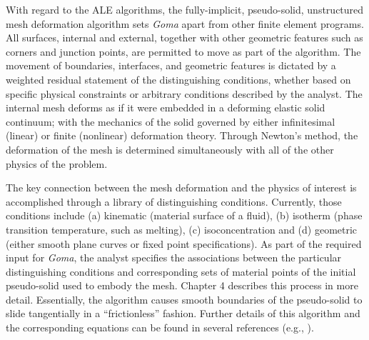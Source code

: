 With regard to the ALE algorithms, the fully-implicit, pseudo-solid, unstructured mesh deformation algorithm sets \emph{Goma} apart from other finite element programs. All surfaces, internal and external, together with other geometric features such as corners and junction points, are permitted to move as part of the algorithm. The movement of boundaries, interfaces, and geometric features is dictated by a weighted residual statement of the distinguishing conditions, whether based on specific physical constraints or arbitrary conditions described by the analyst. The internal mesh deforms as if it were embedded in a deforming elastic solid continuum; with the mechanics of the solid governed by either infinitesimal (linear) or finite (nonlinear) deformation theory. Through Newton’s method, the deformation of the mesh is determined simultaneously with all of the other physics of the problem.

The key connection between the mesh deformation and the physics of interest is accomplished through a library of distinguishing conditions. Currently, those conditions include (a) kinematic (material surface of a fluid), (b) isotherm (phase transition temperature, such as melting), (c) isoconcentration
and (d) geometric (either smooth plane curves or fixed point specifications). As part of the required input for \emph{Goma}, the analyst specifies the associations between the particular distinguishing conditions and corresponding sets of material points of the initial pseudo-solid used to embody the mesh. Chapter 4 describes this process in more detail. Essentially, the algorithm causes smooth boundaries of the pseudo-solid to slide tangentially in a “frictionless” fashion. Further details of this algorithm and the corresponding equations can be found in several references (e.g., \citealt{PseudoSolid}).

